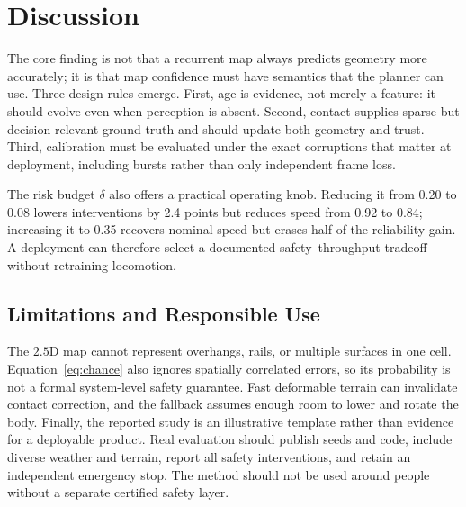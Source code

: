 \section{Discussion}

The core finding is not that a recurrent map always predicts geometry more accurately; it
is that map confidence must have semantics that the planner can use. Three design rules
emerge. First, age is evidence, not merely a feature: it should evolve even when perception
is absent. Second, contact supplies sparse but decision-relevant ground truth and should
update both geometry and trust. Third, calibration must be evaluated under the exact
corruptions that matter at deployment, including bursts rather than only independent
frame loss.

The risk budget $\delta$ also offers a practical operating knob. Reducing it from 0.20 to
0.08 lowers interventions by 2.4 points but reduces speed from 0.92 to 0.84; increasing it
to 0.35 recovers nominal speed but erases half of the reliability gain. A deployment can
therefore select a documented safety--throughput tradeoff without retraining locomotion.

\subsection{Limitations and Responsible Use}
\label{sec:limitations}

The $2.5$D map cannot represent overhangs, rails, or multiple surfaces in one cell.
Equation~\eqref{eq:chance} also ignores spatially correlated errors, so its probability is
not a formal system-level safety guarantee. Fast deformable terrain can invalidate contact
correction, and the fallback assumes enough room to lower and rotate the body. Finally, the
reported study is an illustrative template rather than evidence for a deployable product.
Real evaluation should publish seeds and code, include diverse weather and terrain, report
all safety interventions, and retain an independent emergency stop. The method should not
be used around people without a separate certified safety layer.

